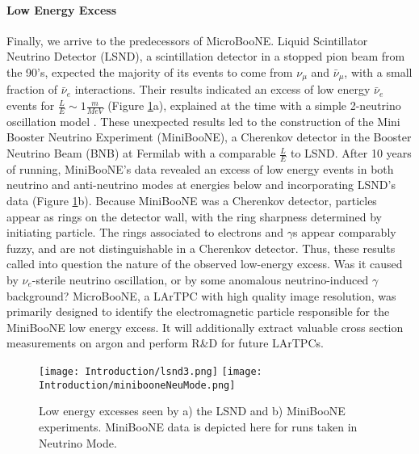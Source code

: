 \paragraph{Low Energy Excess} %
Finally, we arrive to the predecessors of MicroBooNE. Liquid Scintillator Neutrino Detector (LSND), a scintillation detector in a stopped pion beam from the 90's, expected the majority of its events to come from $\nu_\mu$ and $\bar{\nu}_\mu$, with a small fraction of $\bar{\nu}_e$ interactions. Their results indicated an excess of low energy $\bar{\nu}_e$ events for $\frac{L}{E} \sim 1 \frac{m}{MeV}$ (Figure \ref{fig:lsnd}a), explained at the time with a simple 2-neutrino oscillation model \cite{bib:lsnd}. These unexpected results led to the construction of the Mini Booster Neutrino Experiment (MiniBooNE), a Cherenkov detector in the Booster Neutrino Beam (BNB) at Fermilab with a comparable $\frac{L}{E}$ to LSND. After 10 years of running, MiniBooNE's data revealed an excess of low energy events in both neutrino and anti-neutrino modes at energies below and incorporating LSND's data \cite{bib:miniboone} (Figure \ref{fig:lsnd}b). Because MiniBooNE was a Cherenkov detector, particles appear as rings on the detector wall, with the ring sharpness determined by initiating particle. The rings associated to electrons and $\gamma$s appear comparably fuzzy, and are not distinguishable in a Cherenkov detector. Thus, these results called into question the nature of the observed low-energy excess.  Was it caused by $\nu_e$-sterile neutrino oscillation, or by some anomalous neutrino-induced $\gamma$ background?  MicroBooNE, a LArTPC with high quality image resolution, was primarily designed to identify the electromagnetic particle responsible for the MiniBooNE low energy excess. It will additionally extract valuable cross section measurements on argon and perform R\&D for future LArTPCs. 
\begin{figure}[H]
\centering
\texttt{[image: Introduction/lsnd3.png]}
\hspace{1.5 mm}
\texttt{[image: Introduction/minibooneNeuMode.png]}
\caption{Low energy excesses seen by a) the LSND and b) MiniBooNE experiments.  MiniBooNE data is depicted here for runs taken in Neutrino Mode.}
\label{fig:lsnd}
\end{figure}

